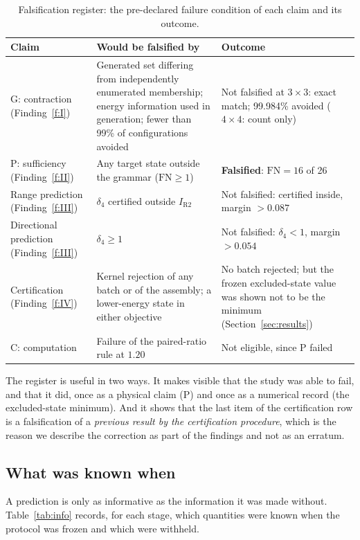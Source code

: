 \documentclass[11pt,a4paper]{article}
\theoremstyle{plain}
\theoremstyle{definition}
\theoremstyle{remark}
\newcommand{\intervalR}{I_{\mathrm{R2}}}
\begin{document}
\begin{table}[t]
\centering\small
\caption{Falsification register: the pre-declared failure condition of each claim and its outcome.}
\label{tab:register}
\begin{tabularx}{\linewidth}{@{}p{2.2cm}p{4.9cm}X@{}}
\toprule
Claim & Would be falsified by & Outcome\\
\midrule
G: contraction (Finding~\ref{f:I}) & Generated set differing from independently enumerated membership; energy information used in generation; fewer than 99\% of configurations avoided & Not falsified at $3\times3$: exact match; 99.984\% avoided ($4\times4$: count only)\\[0.3em]
P: sufficiency (Finding~\ref{f:II}) & Any target state outside the grammar ($\mathrm{FN}\ge1$) & \textbf{Falsified}: $\mathrm{FN}=16$ of 26\\[0.3em]
Range prediction (Finding~\ref{f:III}) & $\delta_4$ certified outside $\intervalR$ & Not falsified: certified inside, margin $>0.087$\\[0.3em]
Directional prediction (Finding~\ref{f:III}) & $\delta_4\ge1$ & Not falsified: $\delta_4<1$, margin $>0.054$\\[0.3em]
Certification (Finding~\ref{f:IV}) & Kernel rejection of any batch or of the assembly; a lower-energy state in either objective & No batch rejected; but the frozen excluded-state value was shown not to be the minimum (Section~\ref{sec:results})\\[0.3em]
C: computation & Failure of the paired-ratio rule at $1.20$ & Not eligible, since P failed\\
\bottomrule
\end{tabularx}
\end{table}

The register is useful in two ways. It makes visible that the study was able to fail, and that it did, once as a physical claim (P) and once as a numerical record (the excluded-state minimum). And it shows that the last item of the certification row is a falsification of a \emph{previous result by the certification procedure}, which is the reason we describe the correction as part of the findings and not as an erratum.

\subsection{What was known when}
A prediction is only as informative as the information it was made without. Table~\ref{tab:info} records, for each stage, which quantities were known when the protocol was frozen and which were withheld.
\end{document}
